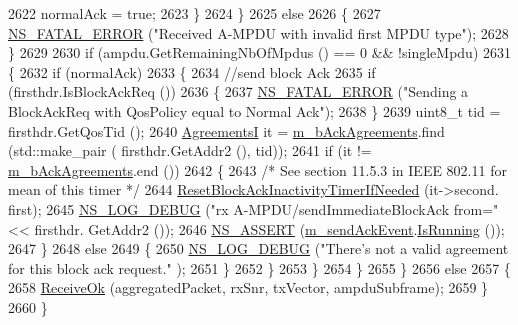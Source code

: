 \begin{DoxyCode}
2622                   normalAck = \textcolor{keyword}{true};
2623                 \}
2624             \}
2625           \textcolor{keywordflow}{else}
2626             \{
2627               \hyperlink{group__fatal_ga5131d5e3f75d7d4cbfd706ac456fdc85}{NS\_FATAL\_ERROR} (\textcolor{stringliteral}{"Received A-MPDU with invalid first MPDU type"});
2628             \}
2629 
2630           \textcolor{keywordflow}{if} (ampdu.GetRemainingNbOfMpdus () == 0 && !singleMpdu)
2631             \{
2632               \textcolor{keywordflow}{if} (normalAck)
2633                 \{
2634                   \textcolor{comment}{//send block Ack}
2635                   \textcolor{keywordflow}{if} (firsthdr.IsBlockAckReq ())
2636                     \{
2637                       \hyperlink{group__fatal_ga5131d5e3f75d7d4cbfd706ac456fdc85}{NS\_FATAL\_ERROR} (\textcolor{stringliteral}{"Sending a BlockAckReq with QosPolicy equal to Normal
       Ack"});
2638                     \}
2639                   uint8\_t tid = firsthdr.GetQosTid ();
2640                   \hyperlink{classns3_1_1MacLow_a7876cc9b328cdb0508f2a7b7647eab10}{AgreementsI} it = \hyperlink{classns3_1_1MacLow_a53482df1a7e6f136cfa8ce50fa10adc2}{m\_bAckAgreements}.find (std::make\_pair (
      firsthdr.GetAddr2 (), tid));
2641                   \textcolor{keywordflow}{if} (it != \hyperlink{classns3_1_1MacLow_a53482df1a7e6f136cfa8ce50fa10adc2}{m\_bAckAgreements}.end ())
2642                     \{
2643                       \textcolor{comment}{/* See section 11.5.3 in IEEE 802.11 for mean of this timer */}
2644                       \hyperlink{classns3_1_1MacLow_aafa012c5d2dde80484d6546c802f02f8}{ResetBlockAckInactivityTimerIfNeeded} (it->second.
      first);
2645                       \hyperlink{group__logging_ga413f1886406d49f59a6a0a89b77b4d0a}{NS\_LOG\_DEBUG} (\textcolor{stringliteral}{"rx A-MPDU/sendImmediateBlockAck from="} << firsthdr.
      GetAddr2 ());
2646                       \hyperlink{assert_8h_a6dccdb0de9b252f60088ce281c49d052}{NS\_ASSERT} (\hyperlink{classns3_1_1MacLow_a35ee7cfc983896c26c514bade14b3197}{m\_sendAckEvent}.\hyperlink{classns3_1_1EventId_aabf8476d1a080c199ea0c6aa9ccea372}{IsRunning} ());
2647                     \}
2648                   \textcolor{keywordflow}{else}
2649                     \{
2650                       \hyperlink{group__logging_ga413f1886406d49f59a6a0a89b77b4d0a}{NS\_LOG\_DEBUG} (\textcolor{stringliteral}{"There's not a valid agreement for this block ack request."}
      );
2651                     \}
2652                 \}
2653             \}
2654         \}
2655     \}
2656   \textcolor{keywordflow}{else}
2657     \{
2658       \hyperlink{classns3_1_1MacLow_ade59e3a5e41c6ccbafd93501d7e9fbc0}{ReceiveOk} (aggregatedPacket, rxSnr, txVector, ampduSubframe);
2659     \}
2660 \}
\end{DoxyCode}


